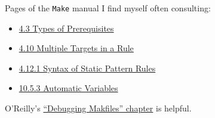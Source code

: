 Pages of the \texttt{Make} manual I find myself often consulting:
\begin{itemize}
	\item \href{https://www.gnu.org/software/make/manual/html_node/Prerequisite-Types.html}{4.3 Types of Prerequisites}
	\item \href{https://www.gnu.org/software/make/manual/html_node/Multiple-Targets.html}{4.10 Multiple Targets in a Rule}
	\item \href{https://www.gnu.org/software/make/manual/html_node/Static-Usage.html}{4.12.1 Syntax of Static Pattern Rules}
	\item \href{https://www.gnu.org/software/make/manual/html_node/Automatic-Variables.html}{10.5.3 Automatic Variables}
\end{itemize}

O'Reilly's \href{https://www.oreilly.com/openbook/make3/book/ch12.pdf}{``Debugging Makfiles'' chapter} is helpful.